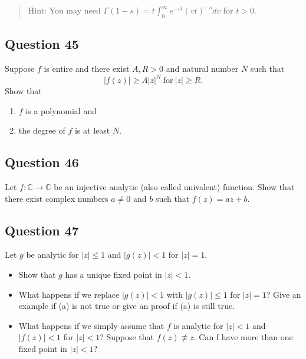 \documentclass[12pt]{article}
\begin{document}
\begin{quote}
Hint: You may need
\(\displaystyle{\Gamma(1-s)=t \int_0^{\infty}e^{-vt}(vt)^{-s} dv}\) for
\(t>0\).
\end{quote}

\hypertarget{question-45-2}{%
\subsection{Question 45}\label{question-45-2}}

Suppose \(f\) is entire and there exist \(A, R >0\) and natural number
\(N\) such that \[|f(z)| \geq A |z|^N\ \text{for}\ |z| \geq R.\] Show
that

\begin{enumerate}
\def\labelenumi{(\roman{enumi})}
\item
  \(f\) is a polynomial and
\item
  the degree of \(f\) is at least \(N\).
\end{enumerate}

\hypertarget{question-46-2}{%
\subsection{Question 46}\label{question-46-2}}

Let \(f: {\mathbb C} \rightarrow {\mathbb C}\) be an injective analytic
(also called univalent) function. Show that there exist complex numbers
\(a \neq 0\) and \(b\) such that \(f(z) = az + b\).

\hypertarget{question-47-2}{%
\subsection{Question 47}\label{question-47-2}}

Let \(g\) be analytic for \(|z|\leq 1\) and \(|g(z)| < 1\) for
\(|z| = 1\).

\begin{itemize}
\item
  Show that \(g\) has a unique fixed point in \(|z| < 1\).
\item
  What happens if we replace \(|g(z)| < 1\) with \(|g(z)|\leq 1\) for
  \(|z|=1\)? Give an example if (a) is not true or give an proof if (a)
  is still true.
\item
  What happens if we simply assume that \(f\) is analytic for
  \(|z| < 1\) and \(|f(z)| < 1\) for \(|z| < 1\)? Suppose that
  \(f(z) \not\equiv z\). Can f have more than one fixed point in
  \(|z| < 1\)?
\end{itemize}
\end{document}
